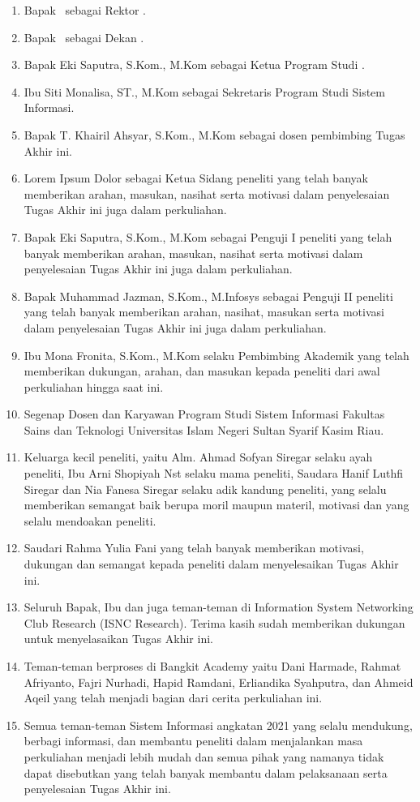 \begin{enumerate}
	\item Bapak \rektor\  sebagai Rektor \universitas.
	\item Bapak \dekan\ sebagai Dekan \fakultas.
	\item Bapak Eki Saputra, S.Kom., M.Kom sebagai Ketua Program Studi \programStudi.
	\item Ibu Siti Monalisa, ST., M.Kom sebagai Sekretaris Program Studi Sistem Informasi.
	\item Bapak T. Khairil Ahsyar, S.Kom., M.Kom sebagai dosen pembimbing Tugas Akhir ini.
	\item Lorem Ipsum Dolor sebagai Ketua Sidang peneliti yang telah banyak memberikan arahan, masukan, nasihat serta motivasi dalam penyelesaian Tugas Akhir ini juga dalam perkuliahan.
	\item Bapak Eki Saputra, S.Kom., M.Kom sebagai Penguji I peneliti yang telah banyak memberikan arahan, masukan, nasihat serta motivasi dalam penyelesaian Tugas Akhir ini juga dalam perkuliahan.
	\item Bapak Muhammad Jazman, S.Kom., M.Infosys sebagai Penguji II peneliti yang telah banyak memberikan arahan, nasihat, masukan serta motivasi dalam penyelesaian Tugas Akhir ini juga dalam perkuliahan.
	\item Ibu Mona Fronita, S.Kom., M.Kom selaku Pembimbing Akademik yang telah memberikan dukungan, arahan, dan masukan kepada peneliti dari awal perkuliahan hingga saat ini.
	\item Segenap Dosen dan Karyawan Program Studi Sistem Informasi Fakultas Sains dan Teknologi Universitas Islam Negeri Sultan Syarif Kasim Riau.
	\item Keluarga kecil peneliti, yaitu Alm. Ahmad Sofyan Siregar selaku ayah peneliti, Ibu Arni Shopiyah Nst selaku mama peneliti, Saudara Hanif Luthfi Siregar dan Nia Fanesa Siregar selaku adik kandung peneliti, yang selalu memberikan semangat baik berupa moril maupun materil, motivasi dan yang selalu mendoakan peneliti.
	\item Saudari Rahma Yulia Fani yang telah banyak memberikan motivasi, dukungan dan semangat kepada peneliti dalam menyelesaikan Tugas Akhir ini.
	\item Seluruh Bapak, Ibu dan juga teman-teman di Information System Networking Club Research (ISNC Research). Terima kasih sudah memberikan dukungan untuk menyelasaikan Tugas Akhir ini.
	\item Teman-teman berproses di Bangkit Academy yaitu Dani Harmade, Rahmat Afriyanto, Fajri Nurhadi, Hapid Ramdani, Erliandika Syahputra, dan Ahmeid Aqeil yang telah menjadi bagian dari cerita perkuliahan ini.
	\item Semua teman-teman Sistem Informasi angkatan 2021 yang selalu mendukung, berbagi informasi, dan membantu peneliti dalam menjalankan masa perkuliahan menjadi lebih mudah dan semua pihak yang namanya tidak dapat disebutkan yang telah banyak membantu dalam pelaksanaan serta penyelesaian Tugas Akhir ini.
\end{enumerate}

